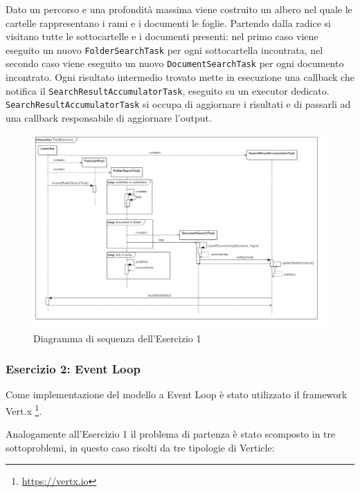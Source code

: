 \documentclass[a4paper]{article}
\begin{document}
Dato un percorso e una profondit\`a massima viene costruito un albero nel quale le cartelle rappresentano i rami e i documenti le foglie.
%
Partendo dalla radice si visitano tutte le sottocartelle e i documenti presenti: nel primo caso viene eseguito un nuovo \texttt{FolderSearchTask} per ogni sottocartella incontrata, nel secondo caso viene eseguito un nuovo \texttt{DocumentSearchTask} per ogni documento incontrato.
%
Ogni risultato intermedio trovato mette in esecuzione una callback che notifica il \texttt{SearchResultAccumulatorTask}, eseguito su un executor dedicato.
\texttt{SearchResultAccumulatorTask} si occupa di aggiornare i risultati e di passarli ad una callback responsabile di aggiornare l'output.
%
\begin{figure}[H]

    \centering

    \includegraphics[width=\linewidth, height=\textheight,keepaspectratio]{TaskExecutors}

    \caption{Diagramma di sequenza dell'Esercizio 1}

    \label{fig:task-executors}

\end{figure}

\subsubsection{Esercizio 2: Event Loop}

Come implementazione del modello a Event Loop \`e stato utilizzato il framework Vert.x \footnote{\url{https://vertx.io}}.

Analogamente all'Esercizio 1 il problema di partenza \`e stato scomposto in tre sottoproblemi, in questo caso risolti da tre tipologie di Verticle:
\end{document}
